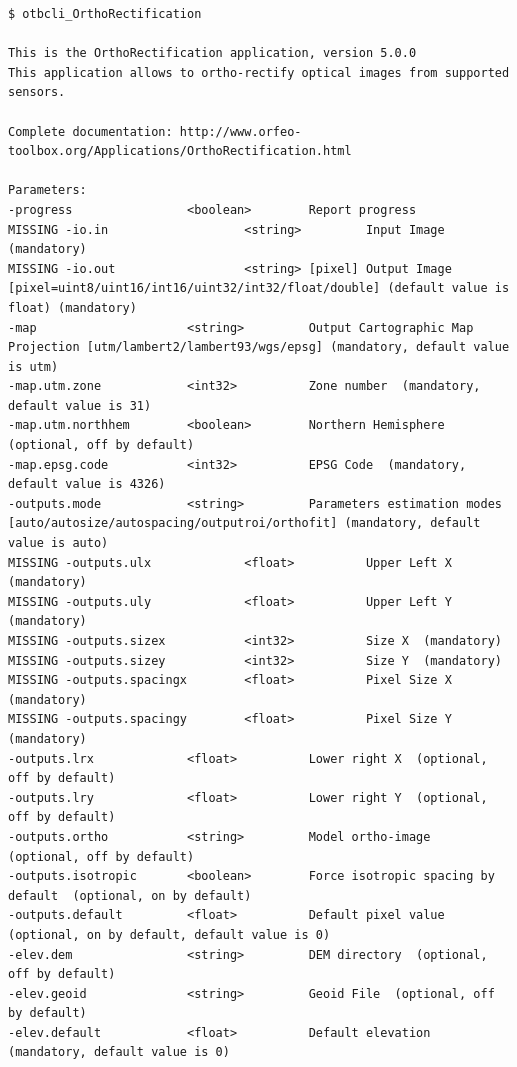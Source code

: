 \documentclass[8pt]{beamer}
\begin{document}
\begin{frame}[fragile]
\begin{scriptsize}
\vspace{-0.5cm}\begin{verbatim}
$ otbcli_OrthoRectification

This is the OrthoRectification application, version 5.0.0
This application allows to ortho-rectify optical images from supported sensors.

Complete documentation: http://www.orfeo-toolbox.org/Applications/OrthoRectification.html

Parameters: 
-progress                <boolean>        Report progress 
MISSING -io.in                   <string>         Input Image  (mandatory)
MISSING -io.out                  <string> [pixel] Output Image  [pixel=uint8/uint16/int16/uint32/int32/float/double] (default value is float) (mandatory)
-map                     <string>         Output Cartographic Map Projection [utm/lambert2/lambert93/wgs/epsg] (mandatory, default value is utm)
-map.utm.zone            <int32>          Zone number  (mandatory, default value is 31)
-map.utm.northhem        <boolean>        Northern Hemisphere  (optional, off by default)
-map.epsg.code           <int32>          EPSG Code  (mandatory, default value is 4326)
-outputs.mode            <string>         Parameters estimation modes [auto/autosize/autospacing/outputroi/orthofit] (mandatory, default value is auto)
MISSING -outputs.ulx             <float>          Upper Left X  (mandatory)
MISSING -outputs.uly             <float>          Upper Left Y  (mandatory)
MISSING -outputs.sizex           <int32>          Size X  (mandatory)
MISSING -outputs.sizey           <int32>          Size Y  (mandatory)
MISSING -outputs.spacingx        <float>          Pixel Size X  (mandatory)
MISSING -outputs.spacingy        <float>          Pixel Size Y  (mandatory)
-outputs.lrx             <float>          Lower right X  (optional, off by default)
-outputs.lry             <float>          Lower right Y  (optional, off by default)
-outputs.ortho           <string>         Model ortho-image  (optional, off by default)
-outputs.isotropic       <boolean>        Force isotropic spacing by default  (optional, on by default)
-outputs.default         <float>          Default pixel value  (optional, on by default, default value is 0)
-elev.dem                <string>         DEM directory  (optional, off by default)
-elev.geoid              <string>         Geoid File  (optional, off by default)
-elev.default            <float>          Default elevation  (mandatory, default value is 0)

\end{verbatim}
\end{scriptsize}
\end{frame}
\end{document}
